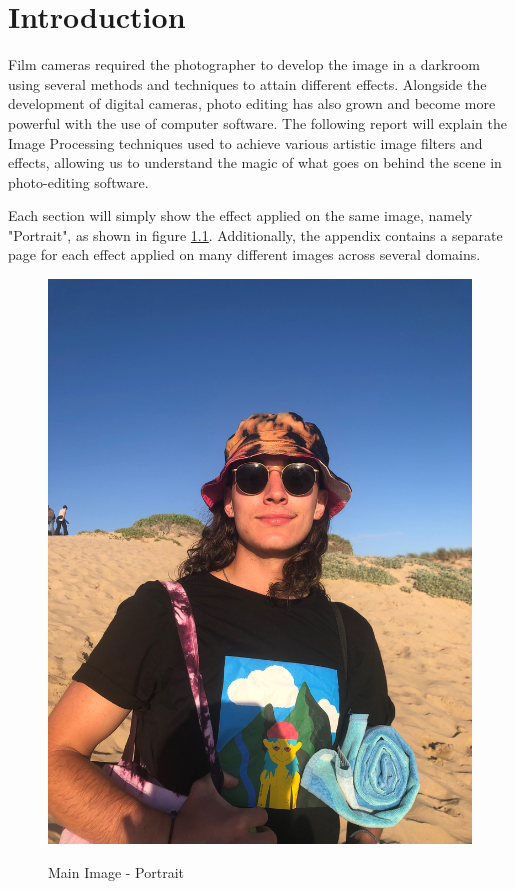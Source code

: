 \documentclass[a4paper,10pt]{report}
\begin{document}
	\tableofcontents
	\newpage
	\listoffigures
	\newpage


	\twocolumn
	\chapter{Introduction}
	 Film cameras required the photographer to develop the image in a darkroom using several methods and techniques to attain different effects. Alongside the development of digital cameras, photo editing has also grown and become more powerful with the use of computer software. The following report will explain the Image Processing techniques used to achieve various artistic image filters and effects, allowing us to understand the magic of what goes on behind the scene in photo-editing software.
	
	
	Each section will simply show the effect applied on the same image, namely "Portrait", as shown in figure \ref{PortraitMain}. Additionally, the appendix contains a separate page for each effect applied on many different images across several domains. 
	
	
	\begin{figure}[h]
		\caption{Main Image - Portrait}
		\centering
		\includegraphics[width=0.8\linewidth]{../Images/Input/Portrait.jpg}
		\label{PortraitMain}
	\end{figure}
\end{document}
